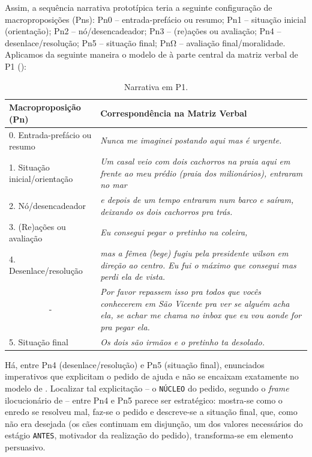 \documentclass{textolivre-html}
\begin{document}
Assim, a sequência narrativa prototípica teria a seguinte configuração de macroproposições (Pns): Pn0 – entrada-prefácio ou resumo; Pn1 – situação inicial (orientação); Pn2 – nó/desencadeador; Pn3 – (re)ações ou avaliação; Pn4 – desenlace/resolução; Pn5 – situação final; PnΩ – avaliação final/moralidade.
Aplicamos da seguinte maneira o modelo de \textcite{adam1992} à parte central da matriz verbal de P1 ():

\begin{table}[htpb]
\caption{Narrativa em P1.}
\label{tbl-tabela-01}
\begin{tabular}{lp{}}
\toprule
Macroproposição (Pn) & Correspondência na Matriz Verbal\\
\midrule
0. Entrada-prefácio ou resumo  & \textit{Nunca me imaginei postando aqui mas é urgente.}\\
1. Situação inicial/orientação & \textit{Um casal veio com dois cachorros na praia aqui em frente ao meu prédio (praia dos milionários), entraram no mar}\\
2. Nó/desencadeador            & \textit{e depois de um tempo entraram num barco e saíram, deixando os dois cachorros pra trás.}\\
3. (Re)ações ou avaliação      & \textit{Eu consegui pegar o pretinho na coleira,}\\
4. Desenlace/resolução         & \textit{mas a fêmea (bege) fugiu pela presidente wilson em direção ao centro. Eu fui o máximo que consegui mas perdi ela de vista.}\\
\multicolumn{1}{c}{-}          & \textit{Por favor repassem isso pra todos que vocês conhecerem em São Vicente pra ver se alguém acha ela, se achar me chama no inbox que eu vou aonde for pra pegar ela.} \\
5. Situação final              & \textit{Os dois são irmãos e o pretinho ta desolado.} \\
\bottomrule
\end{tabular}
\end{table}

Há, entre Pn4 (desenlace/resolução) e Pn5 (situação final), enunciados imperativos que explicitam o pedido de ajuda e não se encaixam exatamente no modelo de \textcite{adam1992}. Localizar tal explicitação – o \texttt{NÚCLEO} do pedido, segundo o \textit{frame} ilocucionário de \textcite{panther2017} -- entre Pn4 e Pn5 parece ser estratégico: mostra-se como o enredo se resolveu mal, faz-se o pedido e descreve-se a situação final, que, como não era desejada (os cães continuam em disjunção, um dos valores necessários do estágio \texttt{ANTES}, motivador da realização do pedido), transforma-se em elemento persuasivo.
\end{document}
